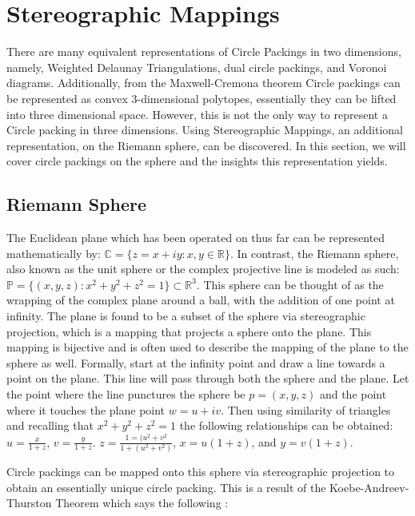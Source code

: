 \documentclass[11pt]{article}
\newcommand{\R}{\mathbb{R}}
\newcommand{\C}{\mathbb{C}}
\theoremstyle{definition}
\begin{document}
\section{Stereographic Mappings}

	There are many equivalent representations of Circle Packings in two dimensions, namely, Weighted Delaunay Triangulations, dual circle packings, and Voronoi diagrams. 
	Additionally, from the Maxwell-Cremona theorem Circle packings can be represented as convex 3-dimensional polytopes, essentially they can be lifted into three dimensional space. 
	However, this is not the only way to represent a Circle packing in three dimensions. 
	Using Stereographic Mappings, an additional representation, on the Riemann sphere, can be discovered. 
	In this section, we will cover circle packings on the sphere and the insights this representation yields.

\subsection{Riemann Sphere}
	The Euclidean plane which has been operated on thus far can be represented mathematically by: $\C = \{z = x + iy : x, y \in \R \}$. 
	In contrast, the Riemann sphere, also known as the unit sphere or the complex projective line is modeled as such: $\mathbb{P} = \{(x,y,z):x^2 + y^2 + z^2 = 1\} \subset \R^3$. 
	This sphere can be thought of as the wrapping of the complex plane around a ball, with the addition of one point at infinity. 
	The plane is found to be a subset of the sphere via stereographic projection, which is a mapping that projects a sphere onto the plane. 
	This mapping is bijective and is often used to describe the mapping of the plane to the sphere as well. 
	Formally, start at the infinity point and draw a line towards a point on the plane. 
	This line will pass through both the sphere and the plane. 
	Let the point where the line punctures the sphere be $p = (x,y,z)$ and the point where it touches the plane point $w = u + iv$. 
	Then using similarity of triangles and recalling that $x^2 + y^2 + z^2 = 1$ the following relationships can be obtained: $u = \frac{x}{1 + z}$, $v = \frac{y}{1+ z}$. $z = \frac{1 = (u^2 + v^2}{1 + (u^2 + v^2)}$, $x = u(1+z)$, and $y =v(1+z)$.

	Circle packings can be mapped onto this sphere via stereographic projection to obtain an essentially unique circle packing. 
	This is a result of the Koebe-Andreev-Thurston Theorem which says the following \cite{stephenson05introduction}:
\end{document}
